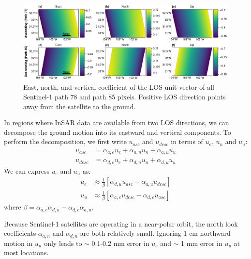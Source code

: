 %

\begin{figure}[!htbp]
	\centering
	\includegraphics[width=.98\textwidth]{figures/chapter3-sar/figure_los_enu_coeffs.pdf}
	\caption[East, north, and vertical coefficients of Sentinel-1 LOS vectors]{East, north, and vertical coefficient of the LOS unit vector of all Sentinel-1 path 78 and path 85 pixels. Positive LOS direction points away from the satellite to the ground.
	}
	\label{fig:los-map}
\end{figure}

In regions where InSAR data are available from two LOS directions, we can decompose the ground motion into its eastward and vertical components.
To perform the decomposition, we first write $u_{asc}$ and $u_{desc}$ in terms of $u_e$, $u_n$ and $u_u$:
\begin{align}
	u_{asc} &= \alpha_{a,e} u_{e} + \alpha_{a,n} u_{n} + \alpha_{a,u} u_{u}\\
	u_{desc} &= \alpha_{d,e} u_{e} + \alpha_{d,n} u_{n} + \alpha_{d,u} u_{u}
\end{align}
We can express $u_e$ and $u_u$ as:
\begin{align}
	u_{e} &\approx  \frac{1}{\beta}  \left[\alpha_{d,u}  u_{asc} - \alpha_{a,u} u_{desc} \right] \\
	u_{u} &\approx  \frac{1}{\beta}  \left[\alpha_{a,e} u_{desc} - \alpha_{d,e}  u_{asc}  \right] 
\end{align}
where  $ \beta = {\alpha_{a,e} \alpha_{d,u}- \alpha_{d,e} \alpha_{a,u}} $.

Because Sentinel-1 satellites are operating in a near-polar orbit, the north look coefficients $\alpha_{a,n}$ and $\alpha_{d,n}$ are both relatively small. Ignoring 1 cm northward motion in $u_n$ only leads to $\sim$ 0.1-0.2 mm error in $u_e$ and $\sim$ 1 mm error in $u_u$ at most locations. 

